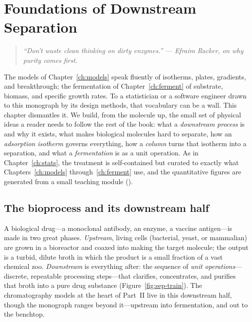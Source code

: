 \chapter{Foundations of Downstream Separation}
\label{ch:sep}

\begin{quote}\itshape
``Don't waste clean thinking on dirty enzymes.'' --- Efraim Racker, on why
purity comes first.
\end{quote}

\noindent
The models of Chapter~\ref{ch:models} speak fluently of isotherms, plates,
gradients, and breakthrough; the fermentation of Chapter~\ref{ch:ferment} of
substrate, biomass, and specific growth rates. To a statistician or a software
engineer drawn to this monograph by its design methods, that vocabulary can be a
wall. This chapter dismantles it. We build, from the molecule up, the small set
of physical ideas a reader needs to follow the rest of the book: what a
\emph{downstream process} is and why it exists, what makes biological molecules
hard to separate, how an \emph{adsorption isotherm} governs everything, how a
\emph{column} turns that isotherm into a separation, and what a
\emph{fermentation} is as a unit operation. As in Chapter~\ref{ch:stats}, the
treatment is self-contained but curated to exactly what Chapters~\ref{ch:models}
through~\ref{ch:ferment} use, and the quantitative figures are generated from a
small teaching module ().

\section{The bioprocess and its downstream half}
\label{sec:sep-train}

A biological drug---a monoclonal antibody, an enzyme, a vaccine antigen---is made
in two great phases. \emph{Upstream}, living cells (bacterial, yeast, or
mammalian) are grown in a bioreactor and coaxed into making the target molecule;
the output is a turbid, dilute broth in which the product is a small fraction of
a vast chemical zoo. \emph{Downstream} is everything after: the sequence of
\emph{unit operations}---discrete, repeatable processing steps---that clarifies,
concentrates, and purifies that broth into a pure drug substance
(Figure~\ref{fig:sep-train}). The chromatography models at the heart of
Part~II live in this downstream half, though the monograph ranges beyond
it---upstream into fermentation, and out to the benchtop.

